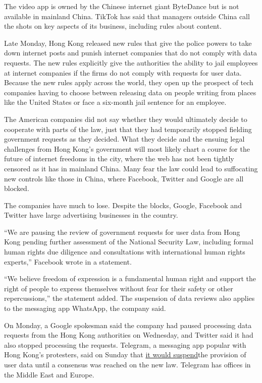 The video app is owned by the Chinese internet giant ByteDance but is
not available in mainland China. TikTok has said that managers outside
China call the shots on key aspects of its business, including rules
about content.

Late Monday, Hong Kong released new rules that give the police powers to
take down internet posts and punish internet companies that do not
comply with data requests. The new rules explicitly give the authorities
the ability to jail employees at internet companies if the firms do not
comply with requests for user data. Because the new rules apply across
the world, they open up the prospect of tech companies having to choose
between releasing data on people writing from places like the United
States or face a six-month jail sentence for an employee.

The American companies did not say whether they would ultimately decide
to cooperate with parts of the law, just that they had temporarily
stopped fielding government requests as they decided. What they decide
and the ensuing legal challenges from Hong Kong's government will most
likely chart a course for the future of internet freedoms in the city,
where the web has not been tightly censored as it has in mainland China.
Many fear the law could lead to suffocating new controls like those in
China, where Facebook, Twitter and Google are all blocked.

The companies have much to lose. Despite the blocks, Google, Facebook
and Twitter have large advertising businesses in the country.

``We are pausing the review of government requests for user data from
Hong Kong pending further assessment of the National Security Law,
including formal human rights due diligence and consultations with
international human rights experts,'' Facebook wrote in a statement.

``We believe freedom of expression is a fundamental human right and
support the right of people to express themselves without fear for their
safety or other repercussions,'' the statement added. The suspension of
data reviews also applies to the messaging app WhatsApp, the company
said.

On Monday, a Google spokesman said the company had paused processing
data requests from the Hong Kong authorities on Wednesday, and Twitter
said it had also stopped processing the requests. Telegram, a messaging
app popular with Hong Kong's protesters, said on Sunday that
\href{https://hongkongfp.com/2020/07/05/exclusive-telegram-to-temporarily-refuse-data-requests-from-hong-kong-courts-amid-security-law-terrorism-row/}{it
would suspend}the provision of user data until a consensus was reached
on the new law. Telegram has offices in the Middle East and Europe.

